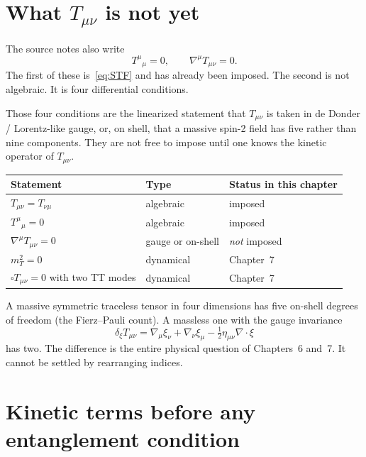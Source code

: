 \section{What \(T_{\mu\nu}\) is not yet}
\label{sec:ch5-not-yet}

The source notes also write
\begin{equation}
  \label{eq:notes-extra}
  T^\mu{}_\mu=0,
  \qquad
  \nabla^\mu T_{\mu\nu}=0.
\end{equation}
The first of these is~\eqref{eq:STF} and has already been imposed.
The second is not algebraic. It is four differential conditions.

Those four conditions are the linearized statement that \(T_{\mu\nu}\)
is taken in de Donder / Lorentz-like gauge, or, on shell, that a
massive spin-2 field has five rather than nine components. They are
not free to impose until one knows the kinetic operator of \(T_{\mu\nu}\).

\begin{center}
\begin{tabular}{@{}lll@{}}
\toprule
Statement & Type & Status in this chapter \\
\midrule
\(T_{\mu\nu}=T_{\nu\mu}\) & algebraic & imposed \\
\(T^\mu{}_\mu=0\) & algebraic & imposed \\
\(\nabla^\mu T_{\mu\nu}=0\) & gauge or on-shell & \emph{not} imposed \\
\(m_T^2=0\) & dynamical & Chapter~7 \\
\(\square T_{\mu\nu}=0\) with two TT modes & dynamical & Chapter~7 \\
\bottomrule
\end{tabular}
\end{center}

A massive symmetric traceless tensor in four dimensions has five
on-shell degrees of freedom (the Fierz--Pauli count). A massless one
with the gauge invariance
\begin{equation}
  \label{eq:tt-gauge}
  \delta_\xi T_{\mu\nu}
  =\nabla_\mu\xi_\nu+\nabla_\nu\xi_\mu
   -\tfrac12\eta_{\mu\nu}\nabla\cdot\xi
\end{equation}
has two. The difference is the entire physical question of
Chapters~6 and~7. It cannot be settled by rearranging indices.

\section{Kinetic terms before any entanglement condition}
\label{sec:ch5-kinetic}

